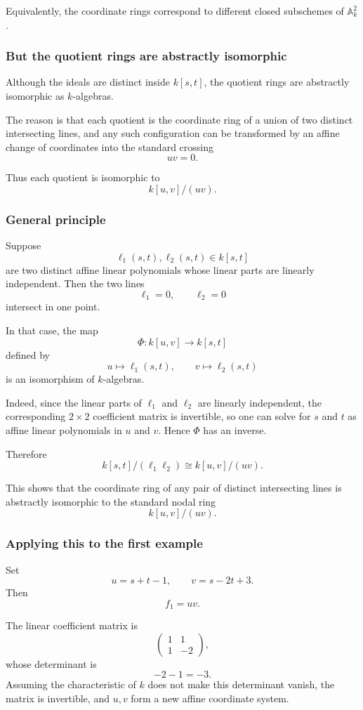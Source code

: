 \documentclass[12pt,a4paper]{article}
\theoremstyle{notespace}
\theoremstyle{definition}
\begin{document}
Equivalently, the coordinate rings correspond to different closed subschemes of \(\mathbb{A}^2_k\).

\subsubsection{But the quotient rings are abstractly isomorphic}

Although the ideals are distinct inside \(k[s,t]\), the quotient rings are abstractly isomorphic as \(k\)-algebras.

The reason is that each quotient is the coordinate ring of a union of two distinct intersecting lines, and any such configuration can be transformed by an affine change of coordinates into the standard crossing
\[
uv=0.
\]

Thus each quotient is isomorphic to
\[
k[u,v]/(uv).
\]

\subsubsection{General principle}

Suppose
\[
\ell_1(s,t),\ell_2(s,t)\in k[s,t]
\]
are two distinct affine linear polynomials whose linear parts are linearly independent. Then the two lines
\[
\ell_1=0,
\qquad
\ell_2=0
\]
intersect in one point.

In that case, the map
\[
\Phi:k[u,v]\longrightarrow k[s,t]
\]
defined by
\[
u\longmapsto \ell_1(s,t),
\qquad
v\longmapsto \ell_2(s,t)
\]
is an isomorphism of \(k\)-algebras.

Indeed, since the linear parts of \(\ell_1\) and \(\ell_2\) are linearly independent, the corresponding \(2\times 2\) coefficient matrix is invertible, so one can solve for \(s\) and \(t\) as affine linear polynomials in \(u\) and \(v\). Hence \(\Phi\) has an inverse.

Therefore
\[
k[s,t]/(\ell_1\ell_2)\cong k[u,v]/(uv).
\]

This shows that the coordinate ring of any pair of distinct intersecting lines is abstractly isomorphic to the standard nodal ring
\[
k[u,v]/(uv).
\]

\subsubsection{Applying this to the first example}

Set
\[
u=s+t-1,
\qquad
v=s-2t+3.
\]
Then
\[
f_1=uv.
\]

The linear coefficient matrix is
\[
\begin{pmatrix}
	1 & 1\\
	1 & -2
\end{pmatrix},
\]
whose determinant is
\[
-2-1=-3.
\]
Assuming the characteristic of \(k\) does not make this determinant vanish, the matrix is invertible, and \(u,v\) form a new affine coordinate system.
\end{document}
